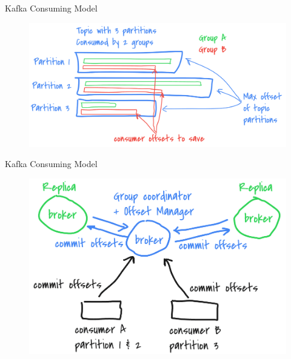 \begin{frame}[plain,t]{Kafka Consuming Model} %
	 \\  \vspace{2ex}
	\begin{figure}
		\centering
		\includegraphics[width=0.9\linewidth]{image/0306}
		\label{fig:0306}
	\end{figure}
	
\end{frame}
\begin{frame}[plain,t]{Kafka Consuming Model} %
	 \\  \vspace{2ex}
	
	\begin{figure}
		\centering
		\includegraphics[width=0.85\linewidth]{image/0309}
		\label{fig:0309}
	\end{figure}
	
\end{frame}
